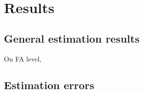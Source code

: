 \section{Results}
\label{sec:Res}

\subsection{General estimation results}
\label{sec:feasest}

On FA level, 

















%

% 
%
%  

%
%
%
%
%






\newpage
\subsection{Estimation errors}
\label{sec:esterr}

